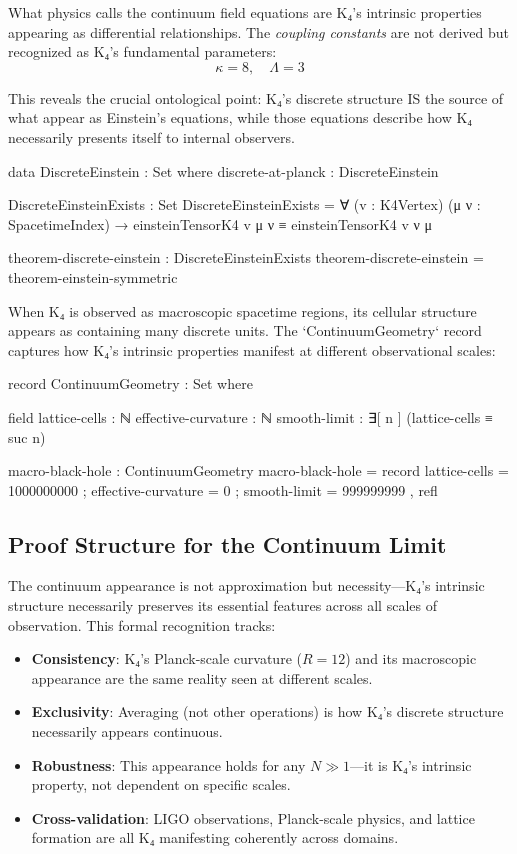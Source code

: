 \documentclass[11pt,a4paper]{book}
\begin{document}
What physics calls the continuum field equations are K₄'s intrinsic properties appearing 
as differential relationships. The \emph{coupling constants} are not derived but recognized 
as K₄'s fundamental parameters:
\[
\kappa = 8, \quad \Lambda = 3
\]

This reveals the crucial ontological point: K₄'s discrete structure IS the source of what 
appear as Einstein's equations, while those equations describe how K₄ necessarily presents 
itself to internal observers.

\begin{code}
data DiscreteEinstein : Set where
  discrete-at-planck : DiscreteEinstein

DiscreteEinsteinExists : Set
DiscreteEinsteinExists = ∀ (v : K4Vertex) (μ ν : SpacetimeIndex) → 
  einsteinTensorK4 v μ ν ≡ einsteinTensorK4 v ν μ

theorem-discrete-einstein : DiscreteEinsteinExists
theorem-discrete-einstein = theorem-einstein-symmetric
\end{code}

When K₄ is observed as macroscopic spacetime regions, its cellular structure appears 
as containing many discrete units. The `ContinuumGeometry` record captures how K₄'s 
intrinsic properties manifest at different observational scales:

\begin{code}
record ContinuumGeometry : Set where

  field
    lattice-cells : ℕ
    effective-curvature : ℕ
    smooth-limit : ∃[ n ] (lattice-cells ≡ suc n)

macro-black-hole : ContinuumGeometry
macro-black-hole = record
  { lattice-cells = 1000000000
  ; effective-curvature = 0
  ; smooth-limit = 999999999 , refl
  }

\end{code}

\subsection{Proof Structure for the Continuum Limit}

The continuum appearance is not approximation but necessity—K₄'s intrinsic structure 
necessarily preserves its essential features across all scales of observation. This 
formal recognition tracks:

\begin{itemize}
\item \textbf{Consistency}: K₄'s Planck-scale curvature ($R = 12$) and its macroscopic appearance 
are the same reality seen at different scales.
\item \textbf{Exclusivity}: Averaging (not other operations) is how K₄'s discrete structure 
necessarily appears continuous.
\item \textbf{Robustness}: This appearance holds for any $N \gg 1$—it is K₄'s intrinsic property, 
not dependent on specific scales.
\item \textbf{Cross-validation}: LIGO observations, Planck-scale physics, and lattice formation 
are all K₄ manifesting coherently across domains.
\end{itemize}
\end{document}
